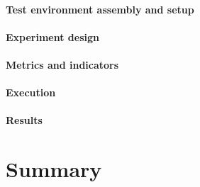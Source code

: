 \documentclass{iccmemoria}
\begin{document}
\subsubsection{Test environment assembly and setup}
\subsubsection{Experiment design}
\subsubsection{Metrics and indicators}
\subsubsection{Execution}
\subsubsection{Results}

\chapter{Summary}

\end{document}
